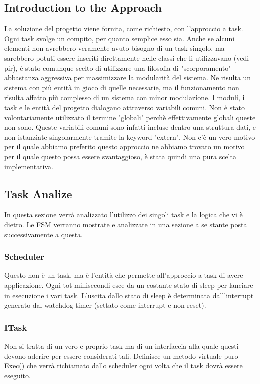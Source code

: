 \documentclass{article}
\begin{document}
\subsection{Introduction to the Approach}
La soluzione del progetto viene fornita, come richiesto, con l'approccio a task. Ogni task svolge un compito, per quanto semplice esso sia. Anche se alcuni elementi non avrebbero veramente avuto bisogno di un task singolo, ma sarebbero potuti essere inseriti direttamente nelle classi che li utilizzavano (vedi pir), è stato comunque scelto di utilizzare una filosofia di "scorporamento" abbastanza aggressiva per massimizzare la modularità del sistema. Ne risulta un sistema con più entità in gioco di quelle necessarie, ma il funzionamento non risulta affatto più complesso di un sistema con minor modulazione. \newline
I moduli, i task e le entità del progetto dialogano attraverso variabili comuni. Non è stato volontariamente utilizzato il termine "globali" perchè effettivamente globali queste non sono. Queste variabili comuni sono infatti incluse dentro una struttura dati, e non istanziate singolarmente tramite la keyword "extern". Non c'è un vero motivo per il quale abbiamo preferito questo approccio ne abbiamo trovato un motivo per il quale questo possa essere svantaggioso, è stata quindi una pura scelta implementativa.

\subsection{Task Analize}
In questa sezione verrà analizzato l'utilizzo dei singoli task e la logica che vi è dietro. Le FSM verranno mostrate e analizzate in una sezione a se stante posta successivamente a questa.

\subsubsection{Scheduler}
Questo non è un task, ma è l'entità che permette all'approccio a task di avere applicazione. Ogni tot millisecondi esce da un costante stato di sleep per lanciare in esecuzione i vari task. L'uscita dallo stato di sleep è determinata dall'interrupt generato dal watchdog timer (settato come interrupt e non reset).

\subsubsection{ITask}
Non si tratta di un vero e proprio task ma di un interfaccia alla quale questi devono aderire per essere considerati tali. Definisce un metodo virtuale puro Exec() che verrà richiamato dallo scheduler ogni volta che il task dovrà essere eseguito.
\end{document}
